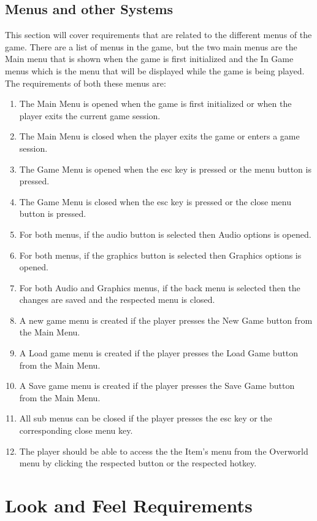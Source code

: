 \documentclass{article}
\begin{document}
\subsection{Menus and other Systems}
\quad This section will cover requirements that are related to the different menus of the game. There are a list of menus in the game, but the two main menus are the Main menu that is shown when the game is first initialized and the In Game menus which is the menu that will be displayed while the game is being played. The requirements of both these menus are:
\begin{enumerate}[{MR}1. ]
	\item The Main Menu is opened when the game is first initialized or when the player exits the current game session.
	\item The Main Menu is closed when the player exits the game or enters a game session.
	\item The Game Menu is opened when the esc key is pressed or the menu button is pressed.
	\item The Game Menu is closed when the esc key is pressed or the close menu button is pressed.
	\item For both menus, if the audio button is selected then Audio options is opened.
	\item For both menus, if the graphics button is selected then Graphics options is opened.
	\item For both Audio and Graphics menus, if the back menu is selected then the changes are saved and the respected menu is closed.
	\item A new game menu is created if the player presses the New Game button from the Main Menu.
	\item A Load game menu is created if the player presses the Load Game button from the Main Menu.
	\item A Save game menu is created if the player presses the Save Game button from the Main Menu.
	\item All sub menus can be closed if the player presses the esc key or the corresponding close menu key.	
	\item The player should  be able to access the the Item's menu from the Overworld menu by clicking the respected button or the respected hotkey.
\end{enumerate}
\section{Look and Feel Requirements}
\end{document}
